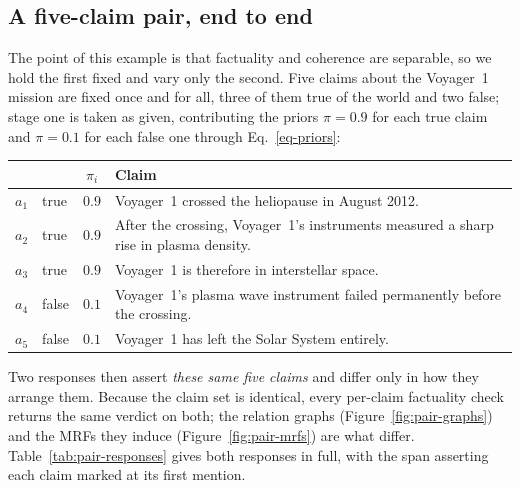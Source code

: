 \subsection{A five-claim pair, end to end}
\label{sec-example-pair}




The point of this example is that factuality and coherence are separable, so we hold the first
fixed and vary only the second. Five claims about the Voyager~1 mission are fixed once and for all,
three of them true of the world and two false; stage one is taken as given, contributing the priors
$\pi=0.9$ for each true claim and $\pi=0.1$ for each false one through Eq.~\ref{eq-priors}:

\begin{center}\small
\begin{tabularx}{0.93\textwidth}{@{}l l c X@{}}
\toprule
 & & $\pi_i$ & Claim \\
\midrule
$a_1$ & true  & $0.9$ & Voyager~1 crossed the heliopause in August 2012. \\
$a_2$ & true  & $0.9$ & After the crossing, Voyager~1's instruments measured a sharp rise in plasma density. \\
$a_3$ & true  & $0.9$ & Voyager~1 is therefore in interstellar space. \\
$a_4$ & false & $0.1$ & Voyager~1's plasma wave instrument failed permanently before the crossing. \\
$a_5$ & false & $0.1$ & Voyager~1 has left the Solar System entirely. \\
\bottomrule
\end{tabularx}
\end{center}

Two responses then assert \emph{these same five claims} and differ only in how they arrange them.
Because the claim set is identical, every per-claim factuality check returns the same verdict on
both; the relation graphs (Figure~\ref{fig:pair-graphs}) and the MRFs they induce
(Figure~\ref{fig:pair-mrfs}) are what differ. Table~\ref{tab:pair-responses} gives both responses in
full, with the span asserting each claim marked  at its first mention.

